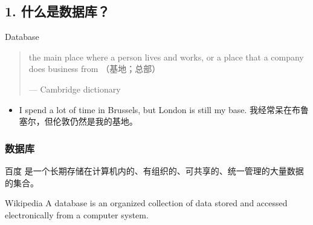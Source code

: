 \documentclass[aspectratio=169, 14pt]{beamer}
\begin{document}
{
    \begin{frame}
        \section{\textcolor{darkmidnightblue}{1. 什么是数据库？}}

        Data\alert{base}

        \pause

        \begin{quote}
            the main place where a person lives and works, or a place that a company does business from （基地；总部）
            \begin{flushright}
                --- Cambridge dictionary
            \end{flushright}
        \end{quote}
        \begin{itemize}
            \item I spend a lot of time in Brussels, but London is still my base. 我经常呆在布鲁塞尔，但伦敦仍然是我的基地。
        \end{itemize}
    \end{frame}

}


\begin{frame}
    \frametitle{数据库}
\begin{block}{百度}
    是一个长期存储在计算机内的、有组织的、可共享的、统一管理的大量数据的集合。
\end{block}
\begin{block}{Wikipedia}
    A database is an organized collection of data stored and accessed electronically from a computer system.
\end{block}
\end{frame}
\end{document}
